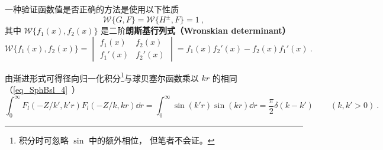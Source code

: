 一种验证函数值是否正确的方法是使用以下性质
\begin{equation}
\mathcal{W}\{G, F\} = \mathcal{W}\{H^\pm, F\} = 1~,
\end{equation}
其中 $\mathcal{W}\{f_1(x), f_2(x)\}$ 是二阶\textbf{朗斯基行列式（Wronskian determinant）}
\begin{equation}
\mathcal{W}\{f_1(x), f_2(x)\} = \begin{vmatrix}
f_1(x)  & f_2(x) \\
f_1'(x) & f_2'(x)
\end{vmatrix} = f_1(x) f_2'(x) - f_2(x) f_1'(x)~.
\end{equation}


由渐进形式可得径向归一化积分\footnote{积分时可忽略 $\sin$ 中的额外相位， 但笔者不会证。}与球贝塞尔函数乘以 $kr$ 的相同（\autoref{eq_SphBsl_4}~）
\begin{equation}
\int_0^\infty F_l(-Z/k', k' r)F_l(-Z/k, kr) \dd{r} = \int_0^\infty \sin(k'r)\sin(kr) \dd{r} = \frac{\pi}{2}\delta(k - k') \qquad (k, k' > 0)~.
\end{equation}
